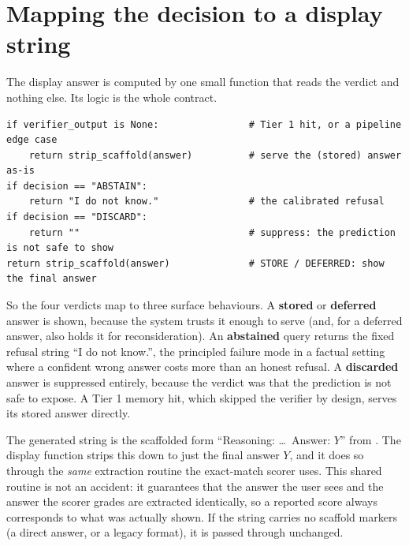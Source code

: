 \section{Mapping the decision to a display string}
\label{sec:output-map}

The display answer is computed by one small function that reads the verdict and
nothing else. Its logic is the whole contract.

\begin{lstlisting}[caption={The display mapping, condensed from \texttt{caem/pipeline.py}.}, label={lst:display}]
if verifier_output is None:                # Tier 1 hit, or a pipeline edge case
    return strip_scaffold(answer)          # serve the (stored) answer as-is
if decision == "ABSTAIN":
    return "I do not know."                # the calibrated refusal
if decision == "DISCARD":
    return ""                              # suppress: the prediction is not safe to show
return strip_scaffold(answer)              # STORE / DEFERRED: show the final answer
\end{lstlisting}

So the four verdicts map to three surface behaviours. A \textbf{stored} or
\textbf{deferred} answer is shown, because the system trusts it enough to serve (and,
for a deferred answer, also holds it for reconsideration). An \textbf{abstained} query
returns the fixed refusal string ``I do not know.'', the principled failure mode in a
factual setting where a confident wrong answer costs more than an honest refusal. A
\textbf{discarded} answer is suppressed entirely, because the verdict was that the
prediction is not safe to expose. A Tier 1 memory hit, which skipped the verifier by
design, serves its stored answer directly.

\begin{precise}
The generated string is the scaffolded form ``Reasoning: \dots\ Answer: $Y$'' from
. The display function strips this down to just the final answer $Y$,
and it does so through the \emph{same} extraction routine the exact-match scorer uses.
This shared routine is not an accident: it guarantees that the answer the user sees
and the answer the scorer grades are extracted identically, so a reported score always
corresponds to what was actually shown. If the string carries no scaffold markers (a
direct answer, or a legacy format), it is passed through unchanged.
\end{precise}

